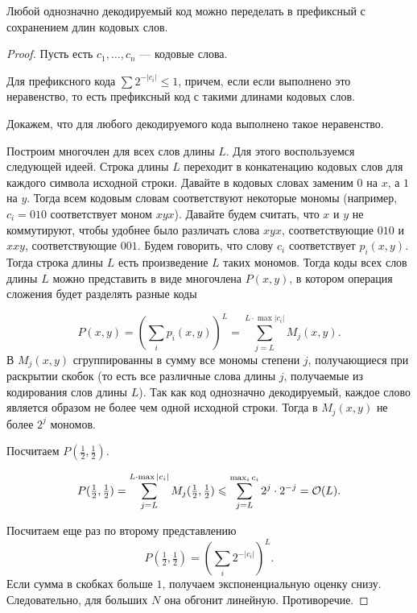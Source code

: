 \begin{thm}
    Любой однозначно декодируемый код можно переделать в префиксный с сохранением длин кодовых слов.
\end{thm}
\begin{proof}
	Пусть есть $  c_1, \ldots , c_n$ --- кодовые слова.

	Для префиксного кода $ \sum 2^{-\lvert c_i \rvert } \le 1$, причем, если если выполнено это неравенство, то есть префиксный код с такими длинами кодовых слов.

	Докажем, что для любого декодируемого кода выполнено такое неравенство.

	Построим многочлен для всех слов длины $ L$. 
	Для этого воспользуемся следующей идеей.
	Строка длины $L$ переходит в конкатенацию кодовых слов для каждого символа исходной строки. Давайте в кодовых словах заменим $0$ на $x$, а $1$ на $y$. Тогда всем кодовым словам соответствуют некоторые мономы (например, $c_i = 010$ соответствует моном $xyx$). Давайте будем считать, что $x$ и $y$ не коммутируют, чтобы удобнее было различать слова $xyx$, соответствующие $010$ и $xxy$, соответствующие $001$. Будем говорить, что слову $c_i$ соответствует $p_i(x,y)$. Тогда строка длины $L$ есть произведение $L$ таких мономов. Тогда коды всех слов длины $L$ можно представить в виде многочлена $P(x, y)$, в котором операция сложения будет разделять разные коды 

	\[
		P(x, y) = \left( \sum_{i}^{} p_i(x, y) \right) ^{L} = \sum_{j=L}^{L\cdot\max|c_i|} M_j(x, y)
	.\] 
	В $M_j(x, y)$ сгруппированны в сумму все мономы степени $j$, получающиеся при раскрытии скобок (то есть все различные слова длины $j$, получаемые из кодирования слов длины $L$). Так как код однозначно декодируемый, каждое слово является образом не более чем одной исходной строки. Тогда в $M_j(x, y)$ не более $2^j$ мономов.

	Посчитаем $ P(\frac{1}{2}, \frac{1}{2})$.

	\[
		P(\tfrac{1}{2},\tfrac{1}{2}) = \sum_{j=L}^{L\cdot\max|c_i|} M_{j}(\tfrac{1}{2},\tfrac{1}{2}) \leqslant \sum_{j=L}^{\max_{i} c_i}2^{j} \cdot 2 ^{-j} = \mathcal{O}(L)
	.\] 

	Посчитаем еще раз по второму представлению
	\[
		P(\tfrac{1}{2},\tfrac{1}{2}) = \left( \sum_{i}^{} 2^{-\lvert c_i \rvert } \right) ^{L}
	.\] 
	Если сумма в скобках больше $ 1$, получаем экспоненциальную оценку снизу.
	Следовательно, для больших $ N$ она обгонит линейную. Противоречие.
	

\end{proof}

